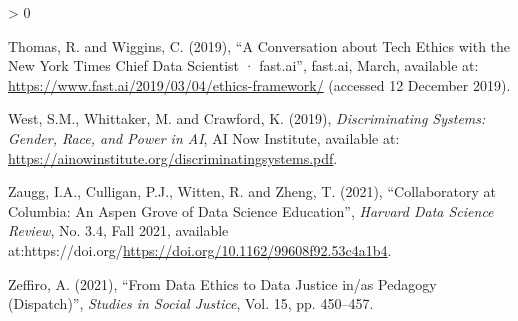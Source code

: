 \documentclass[
]{article}
\newlength{\cslhangindent}
\newenvironment{CSLReferences}[2] %
 {%
  \setlength{\parindent}{0pt}
  \ifodd #1 \everypar{\setlength{\hangindent}{\cslhangindent}}\ignorespaces\fi
  \ifnum #2 > 0
  \setlength{\parskip}{#2\baselineskip}
  \fi
 }%
 {}
\begin{document}
\begin{CSLReferences}{1}{0}
\leavevmode\hypertarget{ref-thomasConversationTechEthics2019}{}%
Thomas, R. and Wiggins, C. (2019), {``A {Conversation} about {Tech}
{Ethics} with the {New} {York} {Times} {Chief} {Data} {Scientist} ·
fast.ai''}, fast.ai, March, available at:
\url{https://www.fast.ai/2019/03/04/ethics-framework/} (accessed 12
December 2019).

\leavevmode\hypertarget{ref-westDiscriminatingSystemsGender2019}{}%
West, S.M., Whittaker, M. and Crawford, K. (2019), \emph{Discriminating
{Systems}: {Gender}, {Race}, and {Power} in {AI}}, AI Now Institute,
available at:
\url{https://ainowinstitute.org/discriminatingsystems.pdf}.

\leavevmode\hypertarget{ref-zauggCollaboratoryColumbiaAspen2021}{}%
Zaugg, I.A., Culligan, P.J., Witten, R. and Zheng, T. (2021),
{``Collaboratory at {Columbia}: {An} {Aspen} {Grove} of {Data} {Science}
{Education}''}, \emph{Harvard Data Science Review}, No. 3.4, Fall 2021,
available
at:https://doi.org/\url{https://doi.org/10.1162/99608f92.53c4a1b4}.

\leavevmode\hypertarget{ref-zeffiroDataEthicsData2021}{}%
Zeffiro, A. (2021), {``From {Data} {Ethics} to {Data} {Justice} in/as
{Pedagogy} ({Dispatch})''}, \emph{Studies in Social Justice}, Vol. 15,
pp. 450--457.

\end{CSLReferences}
\end{document}
